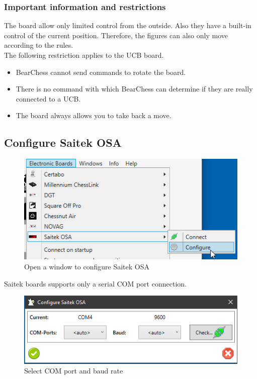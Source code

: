 \documentclass[11pt,a4paper]{article}
\begin{document}
\subsubsection{Important information and restrictions} \label{InformationNovagUCB}
The board allow only limited control from the outside. Also they have a built-in control of the current position. Therefore, the figures can also only move according to the rules.\\
The following restriction applies to the UCB board.

\begin{itemize}
	\item BearChess cannot send commands to rotate the board.
	\item There is no command with which BearChess can determine if they are really connected to a UCB. 
	\item The board always allows you to take back a move.
\end{itemize}

\subsection{Configure Saitek OSA} \label{ConfigureSaitekOSA}

\begin{figure}[H]
	\centering
	\includegraphics[scale=1.0]{Saitek1.png}
	\caption{Open a window to configure Saitek OSA }
	\label{fig:Saitek1}
\end{figure}

Saitek boards supports only a serial COM port connection.

\begin{figure}[H]
	\centering
	\includegraphics[scale=0.9]{Saitek2.png}
	\caption{Select COM port and baud rate}
	\label{fig:Saitek2}
\end{figure}
\end{document}
